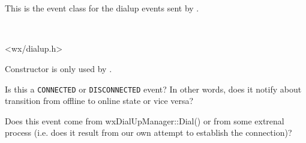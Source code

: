 
\section{}\label{wxdialupevent}

This is the event class for the dialup events sent by 
.


\\


<wx/dialup.h>


\label{wxdialupeventwxdialupevent}


Constructor is only used by .

\label{wxdialupeventisconnectedevent}


Is this a {\tt CONNECTED} or {\tt DISCONNECTED} event? In other words, does it
notify about transition from offline to online state or vice versa?

\label{wxdialupeventisownevent}


Does this event come from wxDialUpManager::Dial() or from some extrenal
process (i.e. does it result from our own attempt to establish the
connection)?

